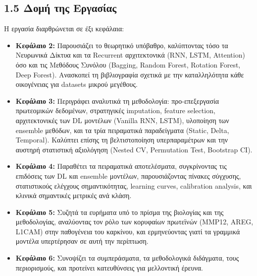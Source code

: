 \subsection{1.5 Δομή της Εργασίας}

Η εργασία διαρθρώνεται σε έξι κεφάλαια:

\begin{itemize}
\item \textbf{Κεφάλαιο 2:} Παρουσιάζει το θεωρητικό υπόβαθρο, καλύπτοντας τόσο τα Νευρωνικά Δίκτυα και τα Recurrent αρχιτεκτονικά (RNN, LSTM, Attention) όσο και τις Μεθόδους Συνόλου (Bagging, Random Forest, Rotation Forest, Deep Forest). Ανασκοπεί τη βιβλιογραφία σχετικά με την καταλληλότητα κάθε οικογένειας για datasets μικρού μεγέθους.
\item \textbf{Κεφάλαιο 3:} Περιγράφει αναλυτικά τη μεθοδολογία: προ-επεξεργασία πρωτεομικών δεδομένων, στρατηγικές imputation, feature selection, αρχιτεκτονικές των DL μοντέλων (Vanilla RNN, LSTM), υλοποίηση των ensemble μεθόδων, και τα τρία πειραματικά παραδείγματα (Static, Delta, Temporal). Καλύπτει επίσης τη βελτιστοποίηση υπερπαραμέτρων και την αυστηρή στατιστική αξιολόγηση (Nested CV, Permutation Test, Bootstrap CI).
\item \textbf{Κεφάλαιο 4:} Παραθέτει τα πειραματικά αποτελέσματα, συγκρίνοντας τις επιδόσεις των DL και ensemble μοντέλων, παρουσιάζοντας πίνακες σύγχυσης, στατιστικούς ελέγχους σημαντικότητας, learning curves, calibration analysis, και κλινικά σημαντικές μετρικές ανά κλάση.
\item \textbf{Κεφάλαιο 5:} Συζητά τα ευρήματα υπό το πρίσμα της βιολογίας και της μεθοδολογίας, αναλύοντας τον ρόλο των κορυφαίων πρωτεϊνών (MMP12, AREG, L1CAM) στην παθογένεια του καρκίνου, και ερμηνεύοντας γιατί τα γραμμικά μοντέλα υπερτέρησαν σε αυτή την περίπτωση.
\item \textbf{Κεφάλαιο 6:} Συνοψίζει τα συμπεράσματα, τα μεθοδολογικά διδάγματα, τους περιορισμούς, και προτείνει κατευθύνσεις για μελλοντική έρευνα.
\end{itemize}

